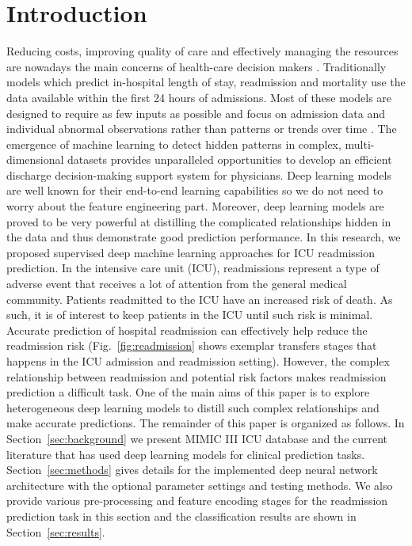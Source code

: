 \documentclass[letterpaper, 10pt, conference]{ieeeconf} %
\newcommand{\sect}[1]{Section~\ref{#1}}
\newcommand{\fig}[1]{Fig.~\ref{#1}}
\begin{document}
\section{Introduction} \label{sec:introduction}
Reducing costs, improving quality of care and effectively managing the resources are nowadays the main concerns of health-care decision makers \cite{curto2016predicting}. Traditionally models which predict in-hospital length of stay, readmission and mortality use the data available within the first 24 hours of admissions. Most of these models are designed to require as few inputs as possible and  focus on admission data and individual abnormal observations rather than patterns or trends over time \cite{tang2018predictive}. The emergence of machine learning to detect hidden patterns in complex, multi-dimensional datasets provides unparalleled opportunities to develop an efficient discharge decision-making support system for physicians. 
Deep learning models are well known for their end-to-end learning capabilities so we do not need to worry about the feature engineering part. Moreover, deep learning models are proved to be very powerful at distilling the complicated relationships hidden in the data and thus demonstrate good prediction performance. 
In this research, we proposed supervised  deep machine learning approaches for ICU readmission prediction. In the intensive care unit (ICU), readmissions represent a type of adverse event that receives a lot of attention from the general medical community. Patients readmitted to the ICU have an increased risk of death. 
As such, it is of interest to keep patients in the ICU until such risk is minimal. Accurate prediction of hospital readmission can effectively help reduce the readmission risk (\fig{fig:readmission} shows exemplar transfers stages that happens in the ICU admission and readmission setting). However, the complex relationship between readmission and potential risk factors makes readmission prediction a difficult task. One of the main aims of this paper is to explore heterogeneous deep learning models to distill such complex relationships and make accurate predictions. The remainder of this paper is organized as follows. In \sect{sec:background} we present  MIMIC III ICU database\cite{johnson2016mimic}  and the current literature that has used deep learning models for clinical prediction tasks.  \sect{sec:methods} gives details for the implemented deep neural network architecture with the optional parameter settings and testing methods. We also provide various pre-processing and feature encoding stages for the readmission prediction task in this section and the classification results are shown in \sect{sec:results}. 
\end{document}

